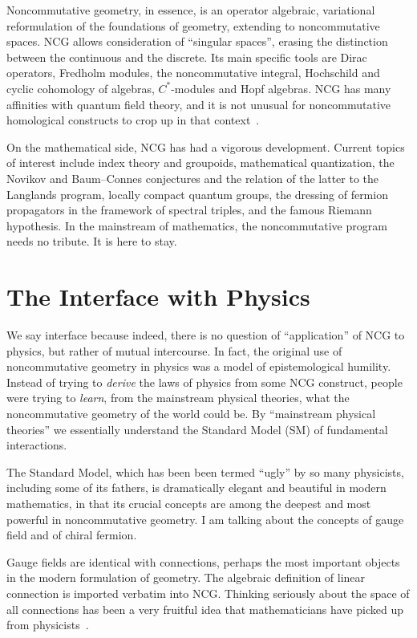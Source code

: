 \documentclass[a4paper,12pt]{article}
\newcommand{\1}{\mathbf{1}}         %
\newcommand{\7}{\dagger}            %
\newcommand{\8}{\bullet}            %
\renewcommand{\.}{\cdot}            %
\renewcommand{\:}{\colon}           %
\begin{document}
\smallskip

Noncommutative geometry, in essence, is an operator algebraic,
variational reformulation of the foundations of geometry, extending to
noncommutative spaces. NCG allows consideration of ``singular
spaces'', erasing the distinction between the continuous and the
discrete. Its main specific tools are Dirac operators, Fredholm
modules, the noncommutative integral, Hochschild and cyclic cohomology
of algebras, $C^*$-modules and Hopf algebras. NCG has many affinities 
with quantum field theory, and it is not unusual for noncommutative 
homological constructs to crop up in that context~\cite{Halley}.

On the mathematical side, NCG has had a vigorous development. Current
topics of interest include index theory and groupoids, mathematical
quantization, the Novikov and Baum--Connes conjectures and the
relation of the latter to the Langlands program, locally compact
quantum groups, the dressing of fermion
propagators in the framework of spectral triples, and the famous
Riemann hypothesis. In the mainstream of mathematics, the
noncommutative program needs no tribute. It is here to stay.



\section{The Interface with Physics}

We say interface because indeed, there is no question of
``application'' of NCG to physics, but rather of mutual intercourse.
In fact, the original use of noncommutative geometry in physics was a
model of epistemological humility. Instead of trying to
{\it derive\/} the laws of physics from some NCG construct, people
were trying to {\it learn}, from the mainstream physical theories,
what the noncommutative geometry of the world could be. By
``mainstream physical theories'' we essentially understand the
Standard Model (SM) of fundamental interactions.

The Standard Model, which has been been termed ``ugly'' by so many
physicists, including some of its fathers, is dramatically elegant and
beautiful in modern mathematics, in that its crucial concepts are
among the deepest and most powerful in noncommutative geometry. I am
talking about the concepts of gauge field and of chiral fermion.

Gauge fields are identical with connections, perhaps the most
important objects in the modern formulation of geometry. The algebraic
definition of linear connection is imported verbatim into NCG. Thinking
seriously about the space of all connections has been a very fruitful
idea that mathematicians have picked up from physicists~\cite{Woit}.
\end{document}

